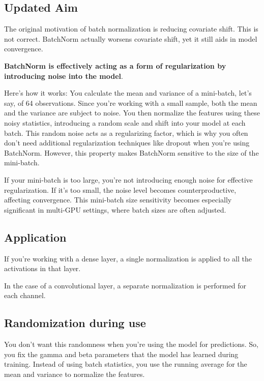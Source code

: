 \documentclass[11pt]{article}
\begin{document}
\subsection{Updated Aim}

The original motivation of batch normalization is reducing covariate shift. This is not correct. BatchNorm actually worsens covariate shift, yet it still aids in model convergence. 

\textbf{BatchNorm is effectively acting as a form of regularization by introducing noise into the model}. 

Here's how it works: You calculate the mean and variance of a mini-batch, let's say, of 64 observations. Since you're working with a small sample, both the mean and the variance are subject to noise. You then normalize the features using these noisy statistics, introducing a random scale and shift into your model at each batch. This random noise acts as a regularizing factor, which is why you often don't need additional regularization techniques like dropout when you're using BatchNorm. However, this property makes BatchNorm sensitive to the size of the mini-batch. 

If your mini-batch is too large, you're not introducing enough noise for effective regularization. If it's too small, the noise level becomes counterproductive, affecting convergence. This mini-batch size sensitivity becomes especially significant in multi-GPU settings, where batch sizes are often adjusted.

\subsection{Application}

If you're working with a dense layer, a single normalization is applied to all the activations in that layer.

In the case of a convolutional layer, a separate normalization is performed for each channel.

\subsection{Randomization during use}

You don't want this randomness when you're using the model for predictions. So, you fix the gamma and beta parameters that the model has learned during training. Instead of using batch statistics, you use the running average for the mean and variance to normalize the features.

\printbibliography
\end{document}
